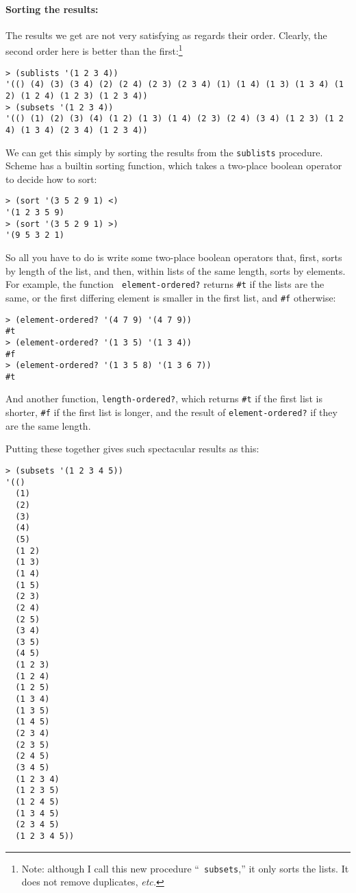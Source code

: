 \documentclass{article}
\begin{document}
\paragraph{Sorting the results:}
The results we get are not very satisfying as regards their order.
Clearly, the second order here is better than the
first:\footnote{Note: although I call this new procedure ``{\tt
    subsets},'' it only sorts the lists.  It does not remove
  duplicates, {\em etc.}}
{\small
  \begin{Verbatim}[frame=single]
> (sublists '(1 2 3 4))
'(() (4) (3) (3 4) (2) (2 4) (2 3) (2 3 4) (1) (1 4) (1 3) (1 3 4) (1 2) (1 2 4) (1 2 3) (1 2 3 4))
> (subsets '(1 2 3 4))
'(() (1) (2) (3) (4) (1 2) (1 3) (1 4) (2 3) (2 4) (3 4) (1 2 3) (1 2 4) (1 3 4) (2 3 4) (1 2 3 4))
\end{Verbatim}
}
We can get this simply by sorting the results from the {\tt sublists}
procedure.  Scheme has a builtin sorting function, which takes a
two-place boolean operator to decide how to sort:
\begin{Verbatim}[frame=single]
> (sort '(3 5 2 9 1) <)
'(1 2 3 5 9)
> (sort '(3 5 2 9 1) >)
'(9 5 3 2 1)
\end{Verbatim}
So all you have to do is write some two-place boolean operators that,
first, sorts by length of the list, and then, within lists of the same
length, sorts by elements.  For example, the function {\tt
  element-ordered?} returns \verb|#t| if the lists are the same, or
the first differing element is smaller in the first list, and
\verb|#f| otherwise:
\begin{Verbatim}[frame=single]
> (element-ordered? '(4 7 9) '(4 7 9))
#t
> (element-ordered? '(1 3 5) '(1 3 4))
#f
> (element-ordered? '(1 3 5 8) '(1 3 6 7))
#t
\end{Verbatim}
And another function, {\tt length-ordered?}, which returns \verb|#t|
if the first list is shorter, \verb|#f| if the first list is
longer, and the result of {\tt element-ordered?} if they are the same
length. 

\newpage
Putting these together gives such spectacular results as this:
{
  \begin{Verbatim}[frame=single]
> (subsets '(1 2 3 4 5))
'(()
  (1)
  (2)
  (3)
  (4)
  (5)
  (1 2)
  (1 3)
  (1 4)
  (1 5)
  (2 3)
  (2 4)
  (2 5)
  (3 4)
  (3 5)
  (4 5)
  (1 2 3)
  (1 2 4)
  (1 2 5)
  (1 3 4)
  (1 3 5)
  (1 4 5)
  (2 3 4)
  (2 3 5)
  (2 4 5)
  (3 4 5)
  (1 2 3 4)
  (1 2 3 5)
  (1 2 4 5)
  (1 3 4 5)
  (2 3 4 5)
  (1 2 3 4 5))
\end{Verbatim}
}
\end{document}
